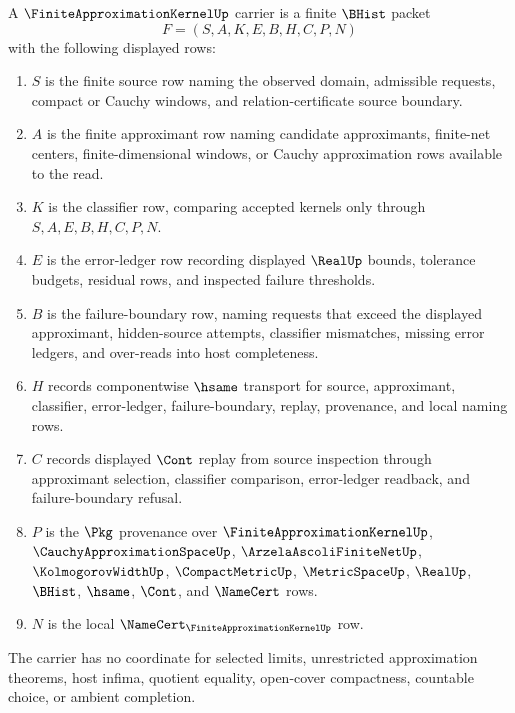 \begin{definition}
\label{def:finite-approximation-kernel-carrier}
A $\FiniteApproximationKernelUp$ carrier is a finite $\BHist$ packet
$$
F=(S,A,K,E,B,H,C,P,N)
$$
with the following displayed rows:
\begin{enumerate}
\item $S$ is the finite source row naming the observed domain, admissible requests, compact or Cauchy windows, and relation-certificate source boundary.
\item $A$ is the finite approximant row naming candidate approximants, finite-net centers, finite-dimensional windows, or Cauchy approximation rows available to the read.
\item $K$ is the classifier row, comparing accepted kernels only through $S,A,E,B,H,C,P,N$.
\item $E$ is the error-ledger row recording displayed $\RealUp$ bounds, tolerance budgets, residual rows, and inspected failure thresholds.
\item $B$ is the failure-boundary row, naming requests that exceed the displayed approximant, hidden-source attempts, classifier mismatches, missing error ledgers, and over-reads into host completeness.
\item $H$ records componentwise $\hsame$ transport for source, approximant, classifier, error-ledger, failure-boundary, replay, provenance, and local naming rows.
\item $C$ records displayed $\Cont$ replay from source inspection through approximant selection, classifier comparison, error-ledger readback, and failure-boundary refusal.
\item $P$ is the $\Pkg$ provenance over $\FiniteApproximationKernelUp$, $\CauchyApproximationSpaceUp$, $\ArzelaAscoliFiniteNetUp$, $\KolmogorovWidthUp$, $\CompactMetricUp$, $\MetricSpaceUp$, $\RealUp$, $\BHist$, $\hsame$, $\Cont$, and $\NameCert$ rows.
\item $N$ is the local $\NameCert_{\FiniteApproximationKernelUp}$ row.
\end{enumerate}
The carrier has no coordinate for selected limits, unrestricted approximation theorems, host infima, quotient equality, open-cover compactness, countable choice, or ambient completion.
\end{definition}

